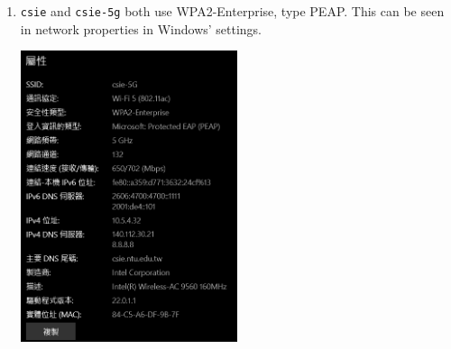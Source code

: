 \documentclass[12pt, a4paper]{article}
\begin{document}
\begin{enumerate}[label=(\alph*)]
    \item \verb|csie| and \verb|csie-5g| both use WPA2-Enterprise, type PEAP. This can be seen
    in network properties in Windows' settings.

    \includegraphics[width=0.5\textwidth]{4-b_csie-5G.png}
  \end{enumerate}
\end{document}
